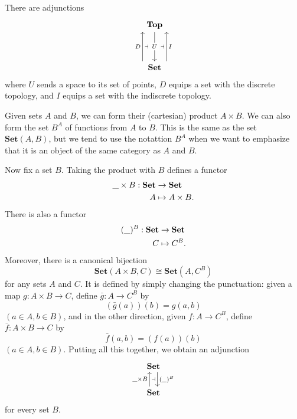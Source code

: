 \documentclass[11pt,a4paper]{article}
\begin{document}
\begin{example}
    There are adjunctions
    \begin{equation*}
    \begin{tikzcd}
        \bcat{Top} \arrow[dd, "U" description] \\ \\
        \bcat{Set} \arrow[uu, shift left=6, "D", "\dashv"'] \arrow[uu, shift right=6, "I"', "\dashv"]
    \end{tikzcd}
    \end{equation*}
    where $U$ sends a space to its set of points, $D$ equips a set with the discrete topology, and $I$ equips a set with the indiscrete topology.
\end{example}
\begin{example}
    Given sets $A$ and $B$, we can form their (cartesian) product $A\times B$. We can also form the set $B^A$ of functions from $A$ to $B$. This is the same as the set $\textbf{Set}(A,B)$, but we tend to use the notattion $B^A$ when we want to emphasize that it is an object of the same category as $A$ and $B$.\par
    Now fix a set $B$. Taking the product with $B$ defines a functor
    \begin{align*}
        \_\times B: \mathbf{Set} &\to \mathbf{Set} \\
        A &\mapsto A\times B.
    \end{align*}
    There is also a functor
    \begin{align*}
        (\_)^B: \mathbf{Set} &\to \mathbf{Set} \\
        C &\mapsto C^B.
    \end{align*}
    Moreover, there is a canonical bijection
    $$ \textbf{Set}(A\times B, C) \cong \textbf{Set}(A, C^B)$$
    for any sets $A$ and $C$. It is defined by simply changing the punctuation: given a map $g:A\times B\to C$, define $\bar{g}: A\to C^B$ by
    $$(\bar{g}(a))(b) = g(a,b)$$
    $(a\in A, b\in B)$, and in the other direction, given $f:A\to C^B$, define $\bar{f}:A\times B\to C$ by
    $$\bar{f}(a,b)=(f(a))(b)$$
    $(a\in A, b\in B)$. Putting all this together, we obtain an adjunction
    \begin{equation*}
    \begin{tikzcd}
        \bcat{Set} \arrow[d, shift left=2, "(\_)^B"] \\
        \bcat{Set} \arrow[u, shift left=2, "\_\times B", "\dashv"']
    \end{tikzcd}
    \end{equation*}
    for every set $B$.
\end{example}
\end{document}
